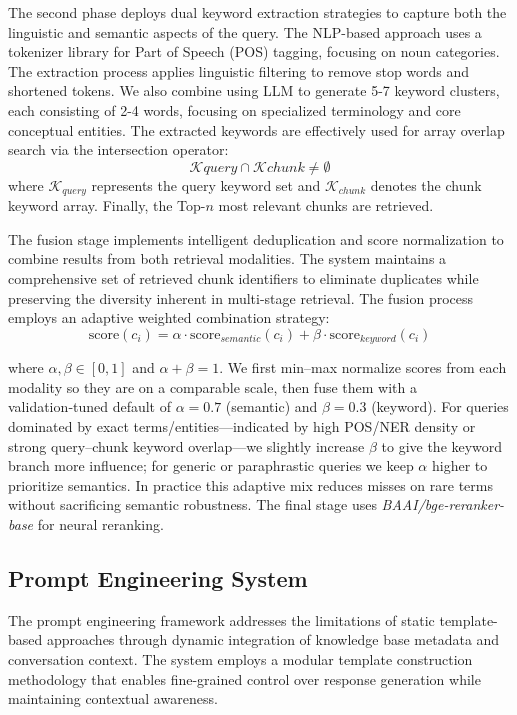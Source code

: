 \documentclass[10pt,twocolumn,letterpaper]{article}
\begin{document}
\vspace{0.5em}
The second phase deploys dual keyword extraction strategies to capture both the linguistic and semantic aspects of the query. The NLP-based approach uses a tokenizer library for Part of Speech (POS) tagging, focusing on noun categories. The extraction process applies linguistic filtering to remove stop words and shortened tokens. We also combine using LLM to generate 5-7 keyword clusters, each consisting of 2-4 words, focusing on specialized terminology and core conceptual entities. The extracted keywords are effectively used for array overlap search via the intersection operator:
$$\mathcal{K}{query} \cap \mathcal{K}{chunk} \neq \emptyset$$
where $\mathcal{K}_{query}$ represents the query keyword set and $\mathcal{K}_{chunk}$ denotes the chunk keyword array. Finally, the Top-$n$ most relevant chunks are retrieved.

\vspace{0.5em}
The fusion stage implements intelligent deduplication and score normalization to combine results from both retrieval modalities. The system maintains a comprehensive set of retrieved chunk identifiers to eliminate duplicates while preserving the diversity inherent in multi-stage retrieval. The fusion process employs an adaptive weighted combination strategy:
$$\text{score}(c_i) = \alpha \cdot \text{score}_{semantic}(c_i) + \beta \cdot \text{score}_{keyword}(c_i)$$

where $\alpha,\beta\in[0,1]$ and $\alpha+\beta=1$. We first min–max normalize scores from each modality so they are on a comparable scale, then fuse them with a validation‑tuned default of $\alpha=0.7$ (semantic) and $\beta=0.3$ (keyword). For queries dominated by exact terms/entities—indicated by high POS/NER density or strong query–chunk keyword overlap—we slightly increase $\beta$ to give the keyword branch more influence; for generic or paraphrastic queries we keep $\alpha$ higher to prioritize semantics. In practice this adaptive mix reduces misses on rare terms without sacrificing semantic robustness. The final stage uses \textit{BAAI/bge-reranker-base} for neural reranking.

\subsection{Prompt Engineering System}

The prompt engineering framework addresses the limitations of static template-based approaches through dynamic integration of knowledge base metadata and conversation context. The system employs a modular template construction methodology that enables fine-grained control over response generation while maintaining contextual awareness.
\end{document}
